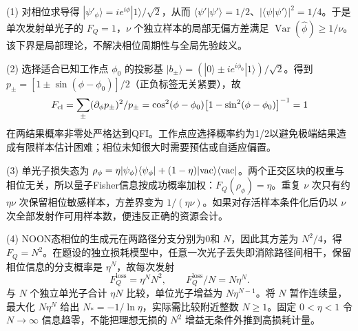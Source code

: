 (1) 对相位求导得 \(|\psi'_\phi\rangle=ie^{i\phi}|1\rangle/\sqrt2\)，从而 \(\langle\psi'|\psi'\rangle=1/2\)、\(|\langle\psi|\psi'\rangle|^2=1/4\)。于是单次发射单光子的 \(\boxed{F_Q=1}\)，\(\nu\) 个独立样本的局部无偏方差满足 \(\operatorname{Var}(\hat\phi)\ge1/\nu\)。该下界是局部理论，不解决相位周期性与全局先验歧义。

(2) 选择适合已知工作点 \(\phi_0\) 的投影基 \(|b_\pm\rangle=(|0\rangle\pm i e^{i\phi_0}|1\rangle)/\sqrt2\)。得到 \(p_\pm=[1\pm\sin(\phi-\phi_0)]/2\)（正负标签无关紧要），故
\[
F_{\rm cl}=\sum_\pm(\partial_\phi p_\pm)^2/p_\pm
=\cos^2(\phi-\phi_0)\bigl[1-\sin^2(\phi-\phi_0)\bigr]^{-1}=1
\]
在两结果概率非零处严格达到QFI。工作点应选择概率约为1/2以避免极端结果造成有限样本估计困难；相位未知很大时需要预估或自适应偏置。

(3) 单光子损失态为 \(\rho_\phi=\eta|\psi_\phi\rangle\langle\psi_\phi|+(1-\eta)|{\rm vac}\rangle\langle{\rm vac}|\)。两个正交区块的权重与相位无关，所以量子Fisher信息按成功概率加权：\(\boxed{F_Q(\rho_\phi)=\eta}\)。重复 \(\nu\) 次只有约 \(\eta\nu\) 次保留相位敏感样本，方差界变为 \(1/(\eta\nu)\)。如果对存活样本条件化后仍以 \(\nu\) 次全部发射作可用样本数，便违反正确的资源会计。

(4) NOON态相位的生成元在两路径分支分别为0和 \(N\)，因此其方差为 \(N^2/4\)，得 \(F_Q=N^2\)。在题设的独立损耗模型中，任意一次光子丢失即消除路径间相干，保留相位信息的分支概率是 \(\eta^N\)，故每次发射
\[
\boxed{F_Q^{\mathrm{loss}}=\eta^N N^2,\qquad F_Q^{\mathrm{loss}}/N=N\eta^N}.
\]
与 \(N\) 个独立单光子合计 \(\eta N\) 比较，单位光子增益为 \(N\eta^{N-1}\)。将 \(N\) 暂作连续量，最大化 \(N\eta^N\) 给出 \(N_*=-1/\ln\eta\)，实际需比较附近整数 \(N\ge1\)。固定 \(0<\eta<1\) 令 \(N\to\infty\) 信息趋零，不能把理想无损的 \(N^2\) 增益无条件外推到高损耗计量。
